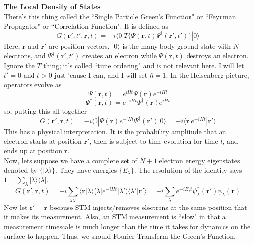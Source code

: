 \documentclass[a4paper,12pt]{article}
\renewcommand{\vec}[1]{\boldsymbol{\mathbf{#1}}}
\begin{document}
\textbf{The Local Density of States} \\

There's this thing called the ``Single Particle Green's Function" or ``Feynman Propagator" or ``Correlation Function".  It is defined as
\begin{equation}
G(\vec{r}',t',\vec{r},t) = -i \langle 0 | T\{\Psi(\vec{r},t) \Psi^\dagger(\vec{r}',t')\} | 0 \rangle
\end{equation}
Here, $\vec{r}$ and $\vec{r}'$ are position vectors, $| 0 \rangle$ is the many body ground state with $N$ electrons, and $\Psi^\dagger(\vec{r}',t')$ creates an electron while $\Psi(\vec{r},t)$ destroys an electron.  Ignore the $T$ thing; it's called ``time ordering" and is not relevant here.  I will let $t'=0$ and $t>0$ just 'cause I can, and I will set $\hbar=1$.  In the Heisenberg picture, operators evolve as
\begin{equation}
\Psi(\vec{r},t)=e^{iHt}\Psi(\vec{r})e^{-iHt}
\end{equation}
\begin{equation}
\Psi^\dagger(\vec{r},t)=e^{-iHt}\Psi^\dagger(\vec{r})e^{iHt}
\end{equation}
so, putting this all together
\begin{equation}
G(\vec{r}',\vec{r},t) = -i \langle 0 | \Psi(\vec{r}) e^{-iHt} \Psi^\dagger(\vec{r}') | 0 \rangle = -i \langle \vec{r} | e^{-iHt} | \vec{r}' \rangle
\end{equation}
This has a physical interpretation.  It is the probability amplitude that an electron starts at position $\vec{r}'$, then is subject to time evolution for time $t$, and ends up at position $\vec{r}$. \\
Now, lets suppose we have a complete set of $N+1$ electron energy eigenstates denoted by $\{ | \lambda \rangle \}$.  They have energies $\{ E_\lambda \}$.  The resolution of the identity says $1=\sum_\lambda{| \lambda \rangle \langle \lambda |}$.
\begin{equation}
G(\vec{r}',\vec{r},t) = -i \sum\limits_{\lambda \lambda'} \langle \vec{r} | \lambda \rangle \langle \lambda | e^{-iHt} | \lambda' \rangle \langle \lambda' | \vec{r}' \rangle = -i \sum\limits_{\lambda} e^{-i E_\lambda t} \psi^*_\lambda(\vec{r}') \psi_\lambda(\vec{r})
\end{equation}
Now let $\vec{r}'=\vec{r}$ because STM injects/removes electrons at the same position that it makes its measurement.  Also, an STM measurement is ``slow" in that a measurement timescale is much longer than the time it takes for dynamics on the surface to happen.  Thus, we should Fourier Transform the Green's Function.
\end{document}
